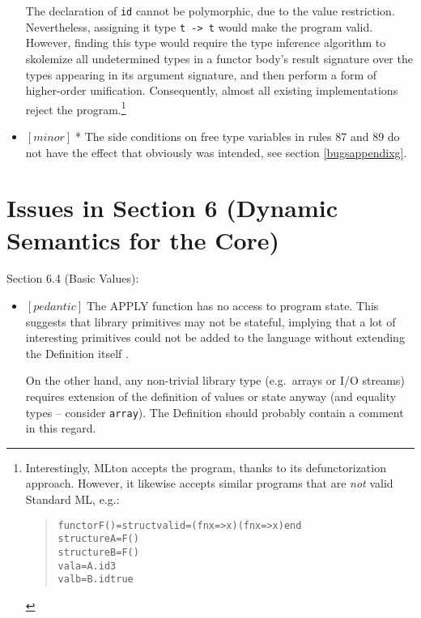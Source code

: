 \documentclass{article}
\newcommand{\m}[1]{$[\mathit{#1}]\;$}
\newcommand{\minor}{\m{minor}}
\newcommand{\pedantic}{\m{pedantic}}
\newcommand{\void}[1]{}
\begin{document}
\begin{itemize}
The declaration of {\tt id} cannot be polymorphic, due to the value restriction. Nevertheless, assigning it type {\tt t -> t} would make the program valid. However,\void{ as Dreyer at al.\ note \cite{typeclasses},} finding this type would require the type inference algorithm to skolemize all undetermined types in a functor body's result signature over the types appearing in its argument signature, and then perform a form of higher-order unification. Consequently, almost all existing implementations reject the program.\footnote{Interestingly, MLton accepts the program, thanks to its defunctorization approach. However, it likewise accepts similar programs that are {\it not} valid Standard ML, e.g.:
\begin{quote}
\begin{alltt}
functor F() = struct val id = (fn x => x) (fn x => x) end\\
structure A = F()\\
structure B = F()\\
val a = A.id 3\\
val b = B.id true
\end{alltt}
\end{quote}
}

\item \minor * The side conditions on free type variables in rules 87 and 89 do not have the effect that obviously was intended, see section \ref{bugsappendixg}.
\end{itemize}


\section{Issues in Section 6 (Dynamic Semantics for the Core)}
\label{bugschapter6}

Section 6.4 (Basic Values):
\nopagebreak

\begin{itemize}
\item \pedantic The APPLY function has no access to program state. This suggests that library primitives may not be stateful, implying that a lot of interesting primitives could not be added to the language without extending the Definition itself \cite{mistakes}.

On the other hand, any non-trivial library type (e.g.\ arrays or I/O streams) requires extension of the definition of values or state anyway (and equality types -- consider {\tt array}). The Definition should probably contain a comment in this regard.
\end{itemize}
\end{document}
